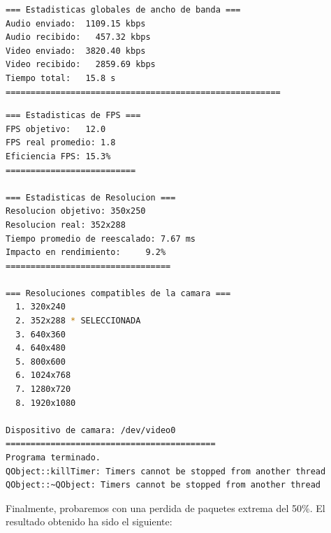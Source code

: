 \begin{adjustbox}{max width=\textwidth}
\begin{lstlisting}[language=bash,basicstyle=\ttfamily\scriptsize]
=== Estadisticas globales de ancho de banda ===
Audio enviado:	1109.15 kbps
Audio recibido:   457.32 kbps
Video enviado:	3820.40 kbps
Video recibido:   2859.69 kbps
Tiempo total: 	15.8 s
=======================================================
\end{lstlisting}
\end{adjustbox}

\begin{adjustbox}{max width=\textwidth}
\begin{lstlisting}[language=bash,basicstyle=\ttfamily\scriptsize]
=== Estadisticas de FPS ===
FPS objetivo: 	12.0
FPS real promedio: 1.8
Eficiencia FPS:	15.3%
==========================

=== Estadisticas de Resolucion ===
Resolucion objetivo: 350x250
Resolucion real: 352x288
Tiempo promedio de reescalado: 7.67 ms
Impacto en rendimiento:    	9.2%
=================================

=== Resoluciones compatibles de la camara ===
  1. 320x240
  2. 352x288 * SELECCIONADA
  3. 640x360
  4. 640x480
  5. 800x600
  6. 1024x768
  7. 1280x720
  8. 1920x1080

Dispositivo de camara: /dev/video0
==========================================
Programa terminado.
QObject::killTimer: Timers cannot be stopped from another thread
QObject::~QObject: Timers cannot be stopped from another thread
\end{lstlisting}
\end{adjustbox}
\vspace{\baselineskip}

\newpage

Finalmente, probaremos con una perdida de paquetes extrema del 50\%. El resultado obtenido ha sido el siguiente:
\vspace{\baselineskip}


